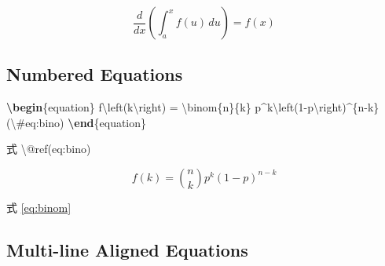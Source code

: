 \documentclass[oneside]{book}
\newenvironment{Shaded}{\begin{snugshade}}{\end{snugshade}}
\newcommand{\KeywordTok}[1]{\textcolor[rgb]{0.13,0.29,0.53}{\textbf{#1}}}
\newcommand{\SpecialCharTok}[1]{\textcolor[rgb]{0.00,0.00,0.00}{#1}}
\newcommand{\SpecialStringTok}[1]{\textcolor[rgb]{0.31,0.60,0.02}{#1}}
\newcommand{\FunctionTok}[1]{\textcolor[rgb]{0.00,0.00,0.00}{#1}}
\newcommand{\ExtensionTok}[1]{#1}
\newcommand{\NormalTok}[1]{#1}
\theoremstyle{definition}
\theoremstyle{definition}
\theoremstyle{definition}
\theoremstyle{remark}
\begin{document}
\begin{equation*} 
\frac{d}{dx}\left( \int_{a}^{x} f(u)\,du\right)=f(x)
\end{equation*}

\subsection{Numbered Equations}\label{numbered-equations}

\begin{Shaded}
\begin{Highlighting}[]
\KeywordTok{\textbackslash{}begin}\NormalTok{\{}\ExtensionTok{equation}\NormalTok{\}}\SpecialStringTok{ }
\SpecialStringTok{  f}\SpecialCharTok{\textbackslash{}left}\SpecialStringTok{(k}\SpecialCharTok{\textbackslash{}right}\SpecialStringTok{) = }\SpecialCharTok{\textbackslash{}binom}\SpecialStringTok{\{n\}\{k\} p^k}\SpecialCharTok{\textbackslash{}left}\SpecialStringTok{(1-p}\SpecialCharTok{\textbackslash{}right}\SpecialStringTok{)^\{n-k\}}
\SpecialStringTok{  (}\SpecialCharTok{\textbackslash{}#}\SpecialStringTok{eq:bino)}
\KeywordTok{\textbackslash{}end}\NormalTok{\{}\ExtensionTok{equation}\NormalTok{\} }

\NormalTok{式 }\FunctionTok{\textbackslash{}@ref}\NormalTok{(eq:bino)}
\end{Highlighting}
\end{Shaded}

\begin{equation} 
  f\left(k\right) = \binom{n}{k} p^k\left(1-p\right)^{n-k}
  \label{eq:binom}
\end{equation}

式 \eqref{eq:binom}

\subsection{Multi-line Aligned
Equations}\label{multi-line-aligned-equations}
\end{document}
